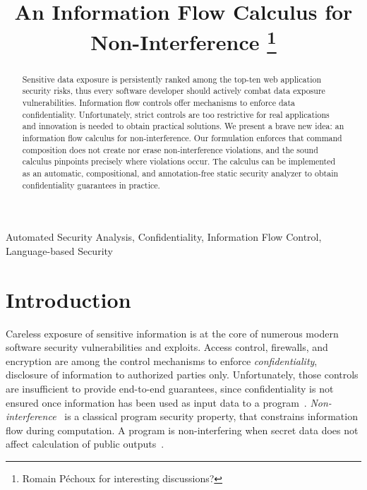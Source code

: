 \documentclass[conference]{IEEEtran}
\begin{document}
\title{An Information Flow Calculus for Non-Interference%
	\thanks{Romain Péchoux for interesting discussions?}
}

\author{
\and
}

\maketitle

\begin{abstract}
Sensitive data exposure is persistently ranked among the top-ten web application security risks, thus every software developer should actively combat data exposure vulnerabilities.
Information flow controls offer mechanisms to enforce data confidentiality.
Unfortunately, strict controls are too restrictive for real applications and innovation is needed to obtain practical solutions.
We present a brave new idea: an information flow calculus for non-interference.
Our formulation enforces that command composition does not create nor erase non-interference violations, and the sound calculus pinpoints precisely where violations occur.
The calculus can be implemented as an automatic, compositional, and annotation-free static security analyzer to obtain confidentiality guarantees in practice.
\end{abstract}

\begin{IEEEkeywords}
	Automated Security Analysis,
	Confidentiality,
	Information Flow Control,
	Language-based Security
\end{IEEEkeywords}

\section{Introduction}
\label{sec:introduction}

Careless exposure of sensitive information is at the core of numerous modern software security vulnerabilities and exploits.
Access control, firewalls, and encryption are among the control mechanisms to enforce \emph{confidentiality}, \ie disclosure of information to  authorized parties only.
Unfortunately, those controls are insufficient to provide end-to-end guarantees, since confidentiality is not ensured once information has been used as input data to a program~\cite{zdancewic2004}.
\emph{Non-interference}~\cite{goguen1982} is a classical program security property, that constrains information flow during computation.
A program is non-interfering when secret data does not affect calculation of public outputs~\cite{sabelfeld2003}.
\end{document}
